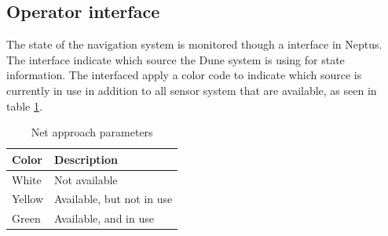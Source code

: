 \subsection{Operator interface}
The state of the navigation system is monitored though a interface in Neptus. The interface indicate which source the Dune system is using for state information. The interfaced apply a color code to indicate which source is currently in use in addition to all sensor system that are available, as seen in table \ref{Tb:Color Code}.
\begin{table}[H]
\begin{center}
    \begin{tabular}{ | l | l |}
    \hline
    \textbf{Color} & \textbf{Description} \\ \hline
    White & Not available \\ \hline
    Yellow & Available, but not in use \\ \hline
    Green & Available, and in use \\ \hline
    \end{tabular}
\end{center}
\caption{Net approach parameters }
\label{Tb:Color Code}
\end{table}